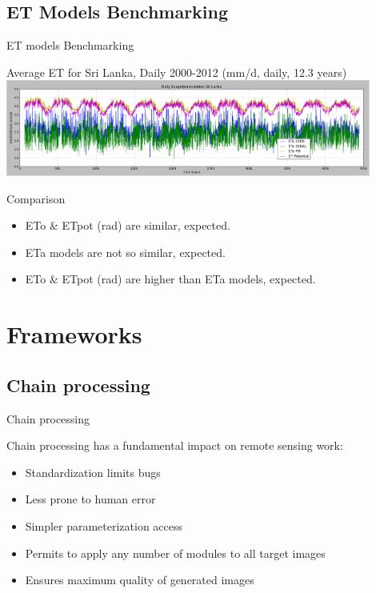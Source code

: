 \documentclass[xcolor=dvipsnames,beamer]{beamer} %
\begin{document}
\subsection{ET Models Benchmarking}
\begin{frame}[fragile]{ET models Benchmarking}

\begin{center}
 Average ET for Sri Lanka, Daily 2000-2012 (mm/d, daily, 12.3 years)
 \includegraphics[width=12cm]{sltemporaletb}
\end{center}

\begin{block}{Comparison}
\begin{itemize}
 \item ETo \& ETpot (rad) are similar, expected.
 \item ETa models are not so similar, expected.
 \item ETo \& ETpot (rad) are higher than ETa models, expected.
\end{itemize}

\end{block}
\end{frame}


\section{Frameworks}
\subsection{Chain processing}
\begin{frame}[fragile]{Chain processing}

Chain processing has a fundamental impact on remote sensing work:\\

\begin{itemize}
 \item Standardization limits bugs
 \item Less prone to human error
 \item Simpler parameterization access
 \item Permits to apply any number of modules to all target images
 \item Ensures maximum quality of generated images
\end{itemize}
\end{frame}
\end{document}

